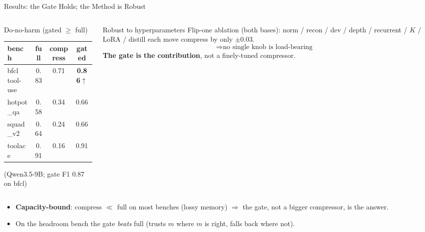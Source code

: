 \begin{frame}{Results: the Gate Holds; the Method is Robust}
  \small
  \begin{columns}[T]
    \begin{column}{0.55\textwidth}
      \begin{block}{Do-no-harm (gated $\ge$ full)}
        \scriptsize
        \begin{tabular}{lccc}
          \toprule
          bench & full & compress & \textbf{gated} \\
          \midrule
          bfcl tool-use & 0.83 & 0.71 & \textbf{0.86}$\uparrow$ \\
          hotpot\_qa & 0.58 & 0.34 & 0.66 \\
          squad\_v2 & 0.64 & 0.24 & 0.66 \\
          toolace & 0.91 & 0.16 & 0.91 \\
          \bottomrule
        \end{tabular}
        \scriptsize (Qwen3.5-9B; gate F1 0.87 on bfcl)
      \end{block}
    \end{column}
    \begin{column}{0.45\textwidth}
      \begin{block}{Robust to hyperparameters}
        \scriptsize Flip-one ablation (both bases): norm / recon / dev / depth / recurrent / $K$ / LoRA / distill each move compress by only $\pm0.03$.
        \[ \Rightarrow \text{no single knob is load-bearing} \]
        \textbf{The gate is the contribution}, not a finely-tuned compressor.
      \end{block}
    \end{column}
  \end{columns}
  \vspace{0.3em}
  \begin{itemize}\scriptsize
    \item \textbf{Capacity-bound}: compress $\ll$ full on most benches (lossy memory) $\Rightarrow$ the gate, not a bigger compressor, is the answer.
    \item On the headroom bench the gate \emph{beats} full (trusts $m$ where $m$ is right, falls back where not).
  \end{itemize}
\end{frame}

